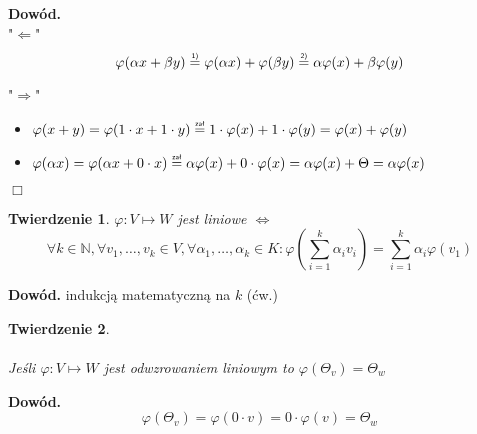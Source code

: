\documentclass[a5paper,8pt]{article}
\newtheorem{theorem}{Twierdzenie}[section]
\newcommand\ass{\mathrel{\overset{\makebox[0pt]{\mbox{\normalfont\tiny\sffamily zał}}}{=}}}
\newcommand\one{\mathrel{\overset{\makebox[0pt]{\mbox{\normalfont\tiny\sffamily 1)}}}{=}}}
\newcommand\two{\mathrel{\overset{\makebox[0pt]{\mbox{\normalfont\tiny\sffamily 2)}}}{=}}}
\begin{document}
    \large{\textbf{Dowód.}} \\
    "$ \Longleftarrow $" \\
    \begin{equation*}
        \varphi( \alpha x + \beta y ) \one \varphi( \alpha x ) + \varphi( \beta y )
        \two \alpha \varphi(x) + \beta \varphi(y)
    \end{equation*}

    "$ \Longrightarrow $" \\
        \begin{itemize}
            \item
                $ \varphi(x + y) = \varphi (1 \cdot x + 1 \cdot y )
                \ass 1 \cdot \varphi(x) + 1 \cdot \varphi(y)
                = \varphi(x) + \varphi(y) $
            \item
                $ \varphi(\alpha x) = \varphi( \alpha x + 0 \cdot x)
                \ass \alpha \varphi(x) + 0 \cdot \varphi(x)
                = \alpha \varphi(x) + \Theta = \alpha \varphi(x) $
        \end{itemize}
        \begin{flushright}
            $ \Box $
        \end{flushright}

    \begin{theorem}
        $ \varphi: V \mapsto W $ jest liniowe $ \Longleftrightarrow $ \\
        \begin{equation*}
            \forall k \in \mathbb{N}, \forall v_1, \ldots, v_k \in V,
            \forall \alpha_1, \ldots, \alpha_k \in K:
            \varphi(\sum_{i = 1}^{k} \alpha_i v_i ) = \sum_{i = 1}^{k} \alpha_i \varphi(v_1)
        \end{equation*}
    \end{theorem}

    \large{\textbf{Dowód.}} indukcją matematyczną na $k$ (ćw.)

    \newpage

    \begin{theorem} \hfill \\\\
        Jeśli $ \varphi: V \mapsto W $ jest odwzrowaniem liniowym to
        $ \varphi(\Theta_v) = \Theta_w $
    \end{theorem}

    \large{\textbf{Dowód.}} \\
    \begin{equation*}
        \varphi(\Theta_v) = \varphi(0 \cdot v) = 0 \cdot \varphi(v) = \Theta_w
    \end{equation*}
\end{document}

